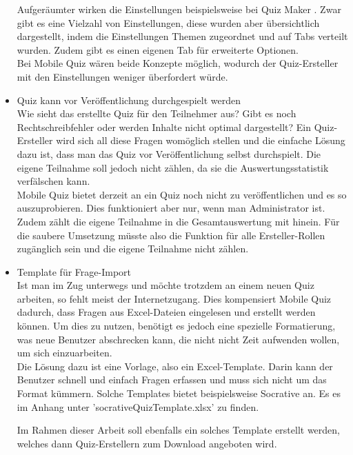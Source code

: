 \begin{itemize}
		Aufgeräumter wirken die Einstellungen beispielsweise bei Quiz Maker \cite{quiz-maker}. Zwar gibt es eine Vielzahl von Einstellungen, diese wurden aber übersichtlich dargestellt, indem die Einstellungen Themen zugeordnet und auf Tabs verteilt wurden. Zudem gibt es einen eigenen Tab für erweiterte Optionen. \\
		Bei Mobile Quiz wären beide Konzepte möglich, wodurch der Quiz-Ersteller mit den Einstellungen weniger überfordert würde.
		
		
		
		\item Quiz kann vor Veröffentlichung durchgespielt werden \\
		Wie sieht das erstellte Quiz für den Teilnehmer aus? Gibt es noch Rechtschreibfehler oder werden Inhalte nicht optimal dargestellt? Ein Quiz-Ersteller wird sich all diese Fragen womöglich stellen und die einfache Lösung dazu ist, dass man das Quiz vor Veröffentlichung selbst durchspielt. Die eigene Teilnahme soll jedoch nicht zählen, da sie die Auswertungsstatistik verfälschen kann. \\
		Mobile Quiz bietet derzeit an ein Quiz noch nicht zu veröffentlichen und es so auszuprobieren. Dies funktioniert aber nur, wenn man Administrator ist. Zudem zählt die eigene Teilnahme in die Gesamtauswertung mit hinein. Für die saubere Umsetzung müsste also die Funktion für alle Ersteller-Rollen zugänglich sein und die eigene Teilnahme nicht zählen.
		
		
		
		\item Template für Frage-Import \\
		Ist man im Zug unterwegs und möchte trotzdem an einem neuen Quiz arbeiten, so fehlt meist der Internetzugang. Dies kompensiert Mobile Quiz dadurch, dass Fragen aus Excel-Dateien eingelesen und erstellt werden können. Um dies zu nutzen, benötigt es jedoch eine spezielle Formatierung, was neue Benutzer abschrecken kann, die nicht nicht Zeit aufwenden wollen, um sich einzuarbeiten. \\
		Die Lösung dazu ist eine Vorlage, also ein Excel-Template. Darin kann der Benutzer schnell und einfach Fragen erfassen und muss sich nicht um das Format kümmern. Solche Templates bietet beispielsweise
		Socrative \cite{socrative.com} an. Es es im Anhang unter 'socrativeQuizTemplate.xlsx' zu finden.
		
		Im Rahmen dieser Arbeit soll ebenfalls ein solches Template erstellt werden, welches dann Quiz-Erstellern zum Download angeboten wird.
		
	\end{itemize}	
	